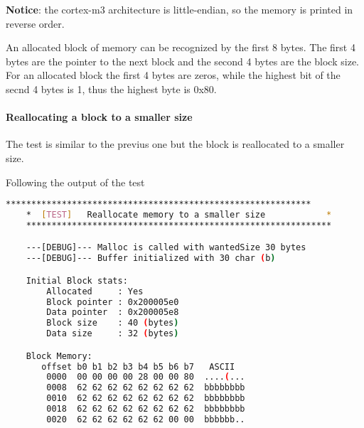     \textbf{Notice}: the cortex-m3 architecture is little-endian, so the memory is printed in reverse order.

    An allocated block of memory can be recognized by the first 8 bytes. The first 4 bytes are the pointer to the next block and the second 4 bytes are the block size. For an allocated block the first 4 bytes are zeros, while the highest bit of the secnd 4 bytes is 1, thus the highest byte is 0x80.

    \paragraph{Reallocating a block to a smaller size}
    The test is similar to the previus one but the block is reallocated to a smaller size.

    Following the output of the test

    \begin{outputbox}
    \begin{lstlisting}[language=bash]
    ************************************************************
    *  [TEST]   Reallocate memory to a smaller size            *
    ************************************************************

    ---[DEBUG]--- Malloc is called with wantedSize 30 bytes
    ---[DEBUG]--- Buffer initialized with 30 char (b)

    Initial Block stats:
        Allocated     : Yes
        Block pointer : 0x200005e0
        Data pointer  : 0x200005e8
        Block size    : 40 (bytes)
        Data size     : 32 (bytes)

    Block Memory:
       offset b0 b1 b2 b3 b4 b5 b6 b7   ASCII
        0000  00 00 00 00 28 00 00 80  ....(...
        0008  62 62 62 62 62 62 62 62  bbbbbbbb
        0010  62 62 62 62 62 62 62 62  bbbbbbbb
        0018  62 62 62 62 62 62 62 62  bbbbbbbb
        0020  62 62 62 62 62 62 00 00  bbbbbb..
    \end{lstlisting}
    \end{outputbox}

